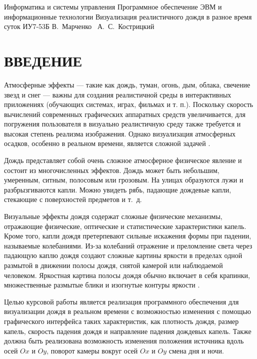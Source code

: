



\makecourseworktitle
    {Информатика и системы управления}
    {Программное обеспечение ЭВМ и информационные технологии}
    {Визуализация реалистичного дождя в разное время суток}
    {ИУ7-53Б}
    {В.~Марченко}
    {~А.~С.~Кострицкий}
    {}
    {}
    
\maketableofcontents

{\centering \chapter*{ВВЕДЕНИЕ}}

Атмосферные эффекты --- такие как дождь, туман, огонь, дым, облака, свечение звезд и снег --- важны для создания реалистичной среды в интерактивных приложениях (обучающих системах, играх, фильмах и т. п.). 
Поскольку скорость вычислений современных графических аппаратных средств увеличивается, для погружения пользователя в визуально реалистичную среду также требуется и высокая степень реализма изображения. 
Однако визуализация атмосферных осадков, особенно в реальном времени, является сложной задачей \cite[1]{Tariq2007}.

Дождь представляет собой очень сложное атмосферное физическое явление и состоит из многочисленных эффектов. 
Дождь может быть небольшим, умеренным, ситным, полосовым или грозовым. 
На улицах образуются лужи и разбрызгиваются капли. 
Можно увидеть рябь, падающие дождевые капли, стекающие с поверхностей предметов и т.~д. \cite{Hao2008}

Визуальные эффекты дождя содержат сложные физические механизмы, отражающие физические, оптические и статистические характеристики капель. 
Кроме того, капли дождя претерпевают сильные искажения формы при падении, называемые колебаниями. 
Из-за колебаний отражение и преломление света через падающую каплю дождя создают сложные картины яркости в пределах одной размытой в движении полосы дождя, снятой камерой или наблюдаемой человеком. 
Яркостная картина полосы дождя обычно включает в себя крапинки, множественные размытые блики и изогнутые контуры яркости \cite{Garg2006}.

Целью курсовой работы является реализация программного обеспечения для визуализации дождя в реальном времени с возможностью изменения с помощью графического интерфейса таких характеристик, как плотность дождя, размер капель, скорость падения дождя и направление падения дождевых капель. 
Также должна быть реализована возможность изменения положения источника вдоль осей $Ox$ и $Oy$, поворот камеры вокруг осей $Ox$ и $Oy$ смена дня и ночи.

